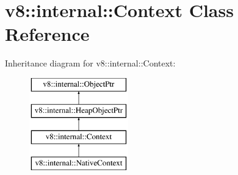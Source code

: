 \hypertarget{classv8_1_1internal_1_1Context}{}\section{v8\+:\+:internal\+:\+:Context Class Reference}
\label{classv8_1_1internal_1_1Context}
Inheritance diagram for v8\+:\+:internal\+:\+:Context\+:\begin{figure}[H]
\begin{center}
\leavevmode
\includegraphics[height=4.000000cm]{classv8_1_1internal_1_1Context}
\end{center}
\end{figure}
